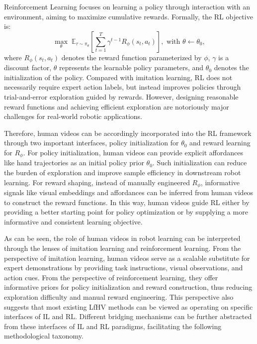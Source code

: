 \documentclass[Afour,sageh,times]{sagej}
\begin{document}
Reinforcement Learning focuses on learning a policy through interaction with an environment, aiming to maximize cumulative rewards. Formally, the RL objective is:
\begin{equation}
\max_{\theta} \; \mathbb{E}_{\tau \sim \pi_{\theta}} \left[
\sum_{t=1}^{T} \gamma^{t-1} R_{\phi}(s_t, a_t)
\right], \,\, \text{with } \theta \leftarrow \theta_{0},
\end{equation}
where $R_{\phi}(s_t, a_t)$ denotes the reward function parameterized by $\phi$, $\gamma$ is a discount factor, $\theta$ represents the learnable policy parameters, and $\theta_{0}$ denotes the initialization of the policy. Compared with imitation learning, RL does not necessarily require expert action labels, but instead improves policies through trial-and-error exploration guided by rewards. However, designing reasonable reward functions and achieving efficient exploration are notoriously major challenges for real-world robotic applications.

Therefore, human videos can be accordingly incorporated into the RL framework through two important interfaces, policy initialization for $\theta_{0}$ and reward learning for $R_{\phi}$. For policy initialization, human videos can provide explicit affordances like hand trajectories as an initial policy prior $\theta_{0}$. Such initialization can reduce the burden of exploration and improve sample efficiency in downstream robot learning. For reward shaping, instead of manually engineered $R_{\phi}$, informative signals like visual embeddings and affordances can be inferred from human videos to construct the reward functions. In this way, human videos guide RL either by providing a better starting point for policy optimization or by supplying a more informative and consistent learning objective.

As can be seen, the role of human videos in robot learning can be interpreted through the lenses of imitation learning and reinforcement learning. From the perspective of imitation learning, human videos serve as a scalable substitute for expert demonstrations by providing task instructions, visual observations, and action cues. From the perspective of reinforcement learning, they offer informative priors for policy initialization and reward construction, thus reducing exploration difficulty and manual reward engineering. This perspective also suggests that most existing LfHV methods can be viewed as operating on specific interfaces of IL and RL. Different bridging mechanisms can be further abstracted from these interfaces of IL and RL paradigms, facilitating the following methodological taxonomy.
\end{document}
